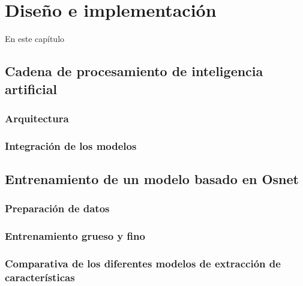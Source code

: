 \chapter{Diseño e implementación} %

\label{Chapter3} %

En este capítulo


\section{Cadena de procesamiento de inteligencia artificial}
\label{sec:cadenaProcesamiento}

\subsection{Arquitectura}

\subsection{Integración de los modelos}


\section{Entrenamiento de un modelo basado en Osnet}
\label{sec:entrenamientoOsnet}

\subsection{Preparación de datos}

\subsection{Entrenamiento grueso y fino}

\subsection{Comparativa de los diferentes modelos de extracción de características}

